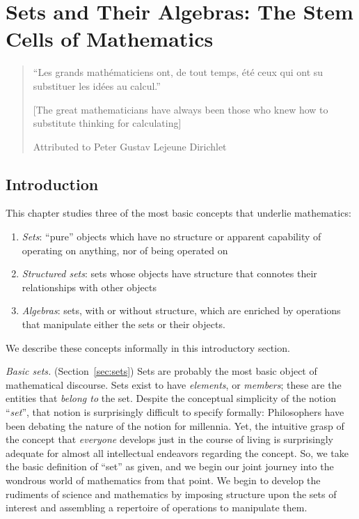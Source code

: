 
\chapter{Sets and Their Algebras:
The Stem Cells of Mathematics}
\label{ch:sets-BA-logic}

\begin{quote}
``Les grands math\'{e}maticiens ont, de tout temps, \'{e}t\'{e} ceux qui ont su substituer les id\'{e}es au calcul.''

\smallskip

[The great mathematicians have always been those who knew how to substitute thinking for calculating]

\smallskip


\hfill Attributed to Peter Gustav Lejeune Dirichlet
\end{quote}


\section{Introduction}

This chapter studies three of the most basic concepts that underlie mathematics:
\begin{enumerate}
\item
{\em Sets}: ``pure'' objects which have no structure or apparent capability of operating on anything, nor of being operated on
\medskip\item
{\em Structured sets}: sets whose objects have structure that connotes their relationships with other objects
\medskip\item
{\em Algebras}: sets, with or without structure, which are enriched by operations that manipulate either the sets or their objects.
\end{enumerate}
We describe these concepts informally in this introductory section.

\bigskip

   
{\it Basic sets.}  (Section~\ref{sec:sets})  Sets are probably the most basic object of mathematical discourse.  Sets exist to have {\it elements},  or {\it members}; these are the entities that {\em belong to} the set.  Despite the conceptual simplicity of the notion ``{\it set}'', that notion is surprisingly difficult to specify formally: Philosophers have been debating the
nature of the notion for millennia.  Yet, the intuitive grasp of the concept that {\em everyone} develops just in the course of living is surprisingly adequate for almost all intellectual endeavors regarding the concept.  So, we take the basic definition of ``set'' as given, and we begin our joint journey into the wondrous world of mathematics from that point.  We begin to develop the rudiments of science and mathematics by imposing structure upon the sets of interest and assembling a repertoire of operations to manipulate them.

